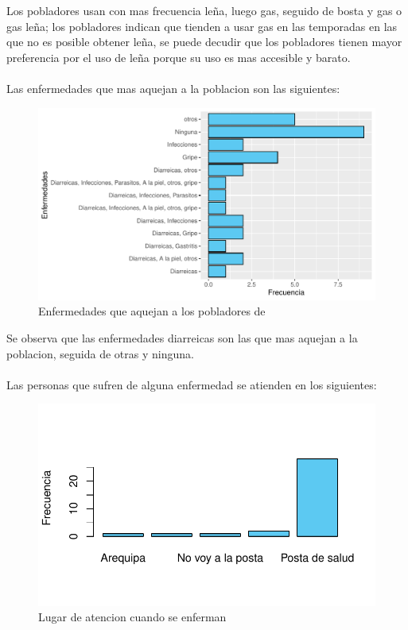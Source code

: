\documentclass[12pt]{article}\usepackage[]{graphicx}\usepackage[]{xcolor}
\makeatletter
\def\maxwidth{ %
  \ifdim\Gin@nat@width>\linewidth
    \linewidth
  \else
    \Gin@nat@width
  \fi
}
\newenvironment{knitrout}{}{} %
\makeatother
\begin{document}
	Los pobladores usan con mas frecuencia leña, luego gas, seguido de bosta y gas o gas leña; los pobladores indican que tienden a usar gas en las temporadas en las que no es posible obtener leña, se puede decudir que los pobladores tienen mayor preferencia por el uso de leña porque su uso es mas accesible y barato.\\
	\\
	Las enfermedades que mas aquejan a la poblacion son las siguientes:
	\begin{figure}[H]
	\centering
\begin{knitrout}
\color{fgcolor}
\includegraphics[width=\maxwidth]{figure/nueve-1} 
\end{knitrout}
	\caption{Enfermedades que aquejan a los pobladores de \comunidad}
	\end{figure}
	Se observa que las enfermedades diarreicas son las que mas aquejan a la poblacion, seguida de otras y ninguna.\\
	\\
	Las personas que sufren de alguna enfermedad se atienden en los siguientes:
	\begin{figure}[H]
	\centering
\begin{knitrout}
\color{fgcolor}
\includegraphics[width=\maxwidth]{figure/once-1} 
\end{knitrout}
	\caption{Lugar de atencion cuando se enferman}
	\end{figure}
\end{document}
